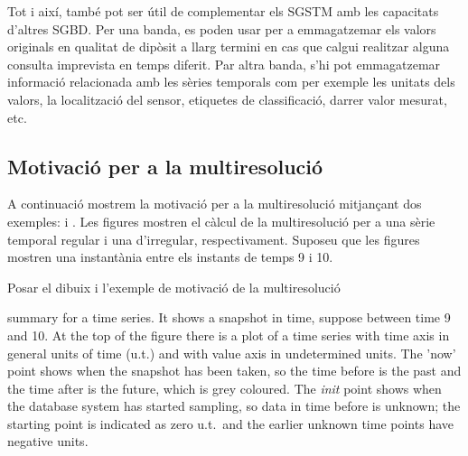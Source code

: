 Tot i així, també pot ser útil de complementar els \gls{SGSTM} amb les
capacitats d'altres \gls{SGBD}. Per una banda, es poden usar per a
emmagatzemar els valors originals en qualitat de dipòsit a llarg
termini en cas que calgui realitzar alguna consulta imprevista en
temps diferit.  Par altra banda, s'hi pot emmagatzemar
informació relacionada amb les sèries temporals com per exemple les
unitats dels valors, la localització del sensor, etiquetes de
classificació, darrer valor mesurat, etc.












\subsection{Motivació per a la multiresolució}


A continuació mostrem la motivació per a la multiresolució mitjançant
dos exemples:  i
. Les figures
mostren el càlcul de la multiresolució per a una sèrie temporal
regular i una d'irregular, respectivament.  Suposeu que les figures
mostren una instantània entre els instants de temps 9 i 10.








Posar el dibuix i l'exemple de motivació de la multiresolució


summary for a time series. It shows a snapshot in time, suppose
between time 9 and 10. At the top of the figure there is a plot of a
time series with time axis in general units of time (u.t.) and with
value axis in undetermined units. The 'now' point shows when the
snapshot has been taken, so the time before is the past and the time
after is the future, which is grey coloured. The \emph{init} point
shows when the database system has started sampling, so data in time
before is unknown; the starting point is indicated as zero u.t.\ and
the earlier unknown time points have negative units.


